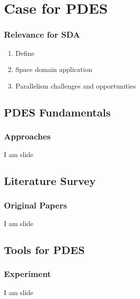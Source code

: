 % 

\section{Case for PDES}
%
\begin{frame}\frametitle{Relevance for SDA}
\begin{enumerate}
	\item Define \pdes
	\item Space domain application
	\item Parallelism challenges and opportunities
\end{enumerate}
\end{frame}

\subsection{PDES Fundamentals}
\begin{frame}\frametitle{Approaches}
	I am slide
\end{frame}

\subsection{Literature Survey}
\begin{frame}\frametitle{Original Papers}
	I am slide
\end{frame}

\subsection{Tools for PDES}
\begin{frame}\frametitle{Experiment}
	I am slide
\end{frame}

\endinput  %
